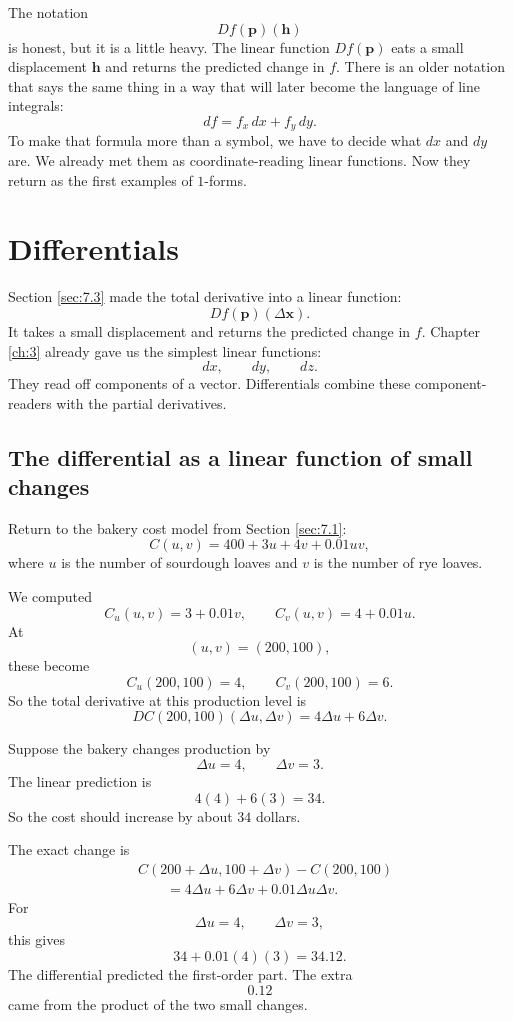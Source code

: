 The notation
\[
    Df(\mathbf p)(\mathbf h)
\]
is honest, but it is a little heavy.  The linear function \(Df(\mathbf p)\) eats a small
displacement \(\mathbf h\) and returns the predicted change in \(f\).  There is an older
notation that says the same thing in a way that will later become the language of line
integrals:
\[
    df=f_x\,dx+f_y\,dy.
\]
To make that formula more than a symbol, we have to decide what \(dx\) and \(dy\)
are.  We already met them as coordinate-reading linear functions.  Now they return
as the first examples of \(1\)-forms.

\section{Differentials}
\label{sec:7.4}

Section \ref{sec:7.3} made the total derivative into a linear function:
\[
    Df(\mathbf p)(\Delta\mathbf x).
\]
It takes a small displacement and returns the predicted change in \(f\).  Chapter
\ref{ch:3} already gave us the simplest linear functions:
\[
    dx,\qquad dy,\qquad dz.
\]
They read off components of a vector.  Differentials combine these component-readers
with the partial derivatives.

\subsection{The differential as a linear function of small changes}

Return to the bakery cost model from Section \ref{sec:7.1}:
\[
    C(u,v)=400+3u+4v+0.01uv,
\]
where \(u\) is the number of sourdough loaves and \(v\) is the number of rye loaves.

We computed
\[
    C_u(u,v)=3+0.01v,
    \qquad
    C_v(u,v)=4+0.01u.
\]
At
\[
    (u,v)=(200,100),
\]
these become
\[
    C_u(200,100)=4,
    \qquad
    C_v(200,100)=6.
\]
So the total derivative at this production level is
\[
    DC(200,100)(\Delta u,\Delta v)
    =
    4\Delta u+6\Delta v.
\]

Suppose the bakery changes production by
\[
    \Delta u=4,
    \qquad
    \Delta v=3.
\]
The linear prediction is
\[
    4(4)+6(3)=34.
\]
So the cost should increase by about \(34\) dollars.

The exact change is
\[
\begin{aligned}
&C(200+\Delta u,100+\Delta v)-C(200,100)\\
&\qquad =
4\Delta u+6\Delta v+0.01\Delta u\Delta v.
\end{aligned}
\]
For
\[
    \Delta u=4,\qquad \Delta v=3,
\]
this gives
\[
    34+0.01(4)(3)=34.12.
\]
The differential predicted the first-order part.  The extra
\[
    0.12
\]
came from the product of the two small changes.

